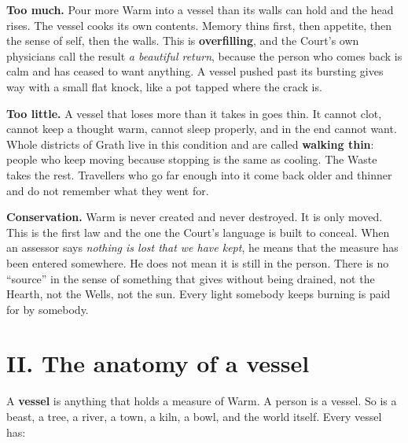 \documentclass{design/chronicle}
\begin{document}
\textbf{Too much.} Pour more Warm into a vessel than its walls can hold and the head rises. The vessel cooks its own contents. Memory thins first, then appetite, then the sense of self, then the walls. This is \textbf{overfilling}, and the Court’s own physicians call the result \emph{a beautiful return}, because the person who comes back is calm and has ceased to want anything. A vessel pushed past its bursting gives way with a small flat knock, like a pot tapped where the crack is.

\textbf{Too little.} A vessel that loses more than it takes in goes thin. It cannot clot, cannot keep a thought warm, cannot sleep properly, and in the end cannot want. Whole districts of Grath live in this condition and are called \textbf{walking thin}: people who keep moving because stopping is the same as cooling. The Waste takes the rest. Travellers who go far enough into it come back older and thinner and do not remember what they went for.

\textbf{Conservation.} Warm is never created and never destroyed. It is only moved. This is the first law and the one the Court’s language is built to conceal. When an assessor says \emph{nothing is lost that we have kept}, he means that the measure has been entered somewhere. He does not mean it is still in the person. There is no “source” in the sense of something that gives without being drained, not the Hearth, not the Wells, not the sun. Every light somebody keeps burning is paid for by somebody.

\section*{II. The anatomy of a vessel}

A \textbf{vessel} is anything that holds a measure of Warm. A person is a vessel. So is a beast, a tree, a river, a town, a kiln, a bowl, and the world itself. Every vessel has:
\end{document}
